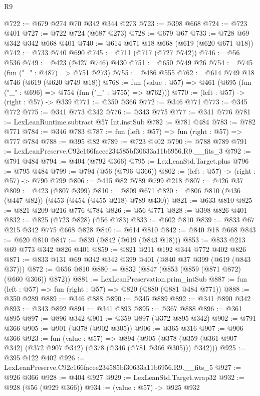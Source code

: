\begin{lexlean}{R9}
\begin{coremodule}
@722 := @679 @274 @70 @342 @344 @273
@723 := @398 @668
@724 := @723 @401
@727 := @722 @724 (@687 @273)
@728 := @679 @67
@733 := @728 @69 @342 @342 @668 @401
@740 := @614 @671 @18 @668 (@619 (@620 @671 @18))
@742 := @733 @740 @690
@745 := @711 (@717 (@727 @742))
@746 := @56 @536
@749 := @423 (@427 @746) @430
@751 := @650 @749 @26
@754 := @745 (fun ("_" : @487) => @751 @273)
@755 := @486 @555
@762 := @614 @749 @18 @746 (@619 (@620 @749 @18))
@768 := fun (value : @57) => @461 (@695 (fun ("_" : @696) => @754 (fun ("_" : @755) => @762)))
@770 := (left : @57) -> (right : @57) -> @339
@771 := @350 @366
@772 := @346 @771
@773 := @345 @772
@775 := @341 @773 @342
@776 := @343 @775
@777 := @341 @776
@781 := LexLeanRuntime.subtract @57 Int.instSub
@782 := @781 @484
@783 := @782 @771
@784 := @346 @783
@787 := fun (left : @57) => fun (right : @57) => @777 @784
@788 := @395 @82
@789 := @723 @402
@790 := @788 @789
@791 := LexLeanPreserve.C92c166facee234585bf30633a11b6956.R9.__fits_3
@792 := @791 @484
@794 := @404 (@792 @366)
@795 := LexLeanStd.Target.plus
@796 := @795 @484
@799 := @794 (@56 (@796 @366))
@802 := (left : @57) -> (right : @57) -> @790 @799
@806 := @415 @82 @789 @799 @218
@807 := @426 @37
@809 := @423 (@807 @399)
@810 := @809 @671
@820 := @806 @810 (@436 (@447 @82)) (@453 (@454 (@455 @218) @789 @430))
@821 := @633 @810
@825 := @821 @209 @216 @776 @784
@826 := @56 @771
@828 := @398 @826 @401
@832 := @825 (@723 @828) (@56 @783)
@833 := @602 @810
@839 := @833 @67 @215 @342 @775 @668 @828
@840 := @614 @810
@842 := @840 @18 @668
@843 := @620 @810
@847 := @839 (@842 (@619 (@843 @18)))
@853 := @833 @213 @69 @773 @342 @826 @401
@859 := @821 @211 @192 @344 @772 @402 @826
@871 := @833 @131 @69 @342 @342 @399 @401 (@840 @37 @399 (@619 (@843 @37)))
@872 := @656 @810
@880 := @832 (@847 (@853 (@859 (@871 @872) (@660 @366)) @872))
@881 := LexLeanPreservation.prim_intSub
@887 := fun (left : @57) => fun (right : @57) => @820 (@880 (@881 @484 @771))
@888 := @350 @289
@889 := @346 @888
@890 := @345 @889
@892 := @341 @890 @342
@893 := @343 @892
@894 := @341 @893
@895 := @367 @888
@896 := @361 @895
@897 := @896 @342
@901 := @359 @897 (@372 @895 @342)
@902 := @791 @366
@905 := @901 (@378 (@902 @305))
@906 := @365 @316
@907 := @906 @366
@923 := fun (value : @57) =>
  @894 (@905 (@378 (@359 (@361 @907 @342) (@372 @907 @342) (@378 (@346 (@781 @366 @305))) @342)))
@925 := @395 @122 @402
@926 := LexLeanPreserve.C92c166facee234585bf30633a11b6956.R9.__fits_5
@927 := @926 @366
@928 := @404 @927
@929 := LexLeanStd.Target.wrap32
@932 := @928 (@56 (@929 @366))
@934 := (value : @57) -> @925 @932

\end{coremodule}
\end{lexlean}
